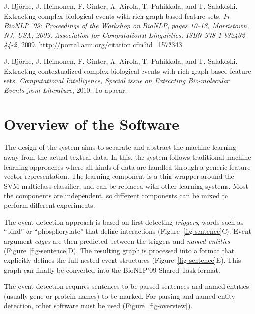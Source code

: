 \documentclass[a4paper,12pt]{article}
\begin{document}
\vspace{5 mm}

J. Bj{\"{o}}rne, J. Heimonen, F. Ginter, A. Airola, T. Pahikkala, and T.
Salakoski. Extracting complex biological events with rich graph-based feature
sets. \emph{In BioNLP ’09: Proceedings of the Workshop on BioNLP, pages 10–18,
Morristown, NJ, USA, 2009. Association for Computational Linguistics. ISBN
978-1-932432-44-2}, 2009. \url{http://portal.acm.org/citation.cfm?id=1572343}

\vspace{5 mm}
   
J. Bj{\"{o}}rne, J. Heimonen, F. Ginter, A. Airola, T. Pahikkala, and T.
Salakoski. Extracting contextualized complex biological events with rich
graph-based feature sets. \emph{Computational Intelligence, Special issue on
Extracting Bio-molecular Events from Literature}, 2010. To appear.

\section{Overview of the Software}

The design of the system aims to separate and abstract the machine learning away
from the actual textual data. In this, the system follows traditional machine
learning approaches where all kinds of data are handled through a generic feature
vector representation. The learning component is a thin wrapper around the
SVM-multiclass classifier, and can be replaced with other learning systems. Most
the components are independent, so different components can be mixed to perform
different experiments.

The event detection approach is based on first detecting \emph{triggers}, words
such as ``bind'' or ``phosphorylate'' that define interactions
(Figure~\ref{fig-sentence}C). Event argument \emph{edges} are then predicted
between the triggers and \emph{named entities} (Figure~\ref{fig-sentence}D).
The resulting graph is processed into a format that explicitly defines the full
nested event structures (Figure~\ref{fig-sentence}E). This graph can finally be
converted into the BioNLP'09 Shared Task format.

The event detection requires sentences to be parsed sentences and named
entities (usually gene or protein names) to be marked. For parsing and named
entity detection, other software must be used (Figure~\ref{fig-overview}).
\end{document}
